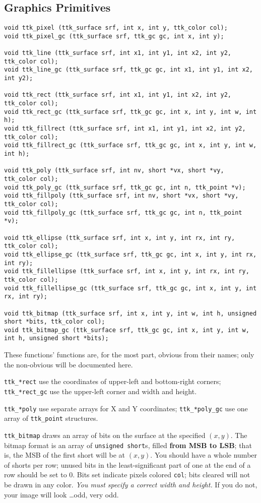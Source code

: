 \documentclass[12pt,letterpaper]{report}
\begin{document}
\subsection{Graphics Primitives}
{\footnotesize
\begin{verbatim}
void ttk_pixel (ttk_surface srf, int x, int y, ttk_color col);
void ttk_pixel_gc (ttk_surface srf, ttk_gc gc, int x, int y);

void ttk_line (ttk_surface srf, int x1, int y1, int x2, int y2, ttk_color col);
void ttk_line_gc (ttk_surface srf, ttk_gc gc, int x1, int y1, int x2, int y2);

void ttk_rect (ttk_surface srf, int x1, int y1, int x2, int y2, ttk_color col);
void ttk_rect_gc (ttk_surface srf, ttk_gc gc, int x, int y, int w, int h);
void ttk_fillrect (ttk_surface srf, int x1, int y1, int x2, int y2, ttk_color col);
void ttk_fillrect_gc (ttk_surface srf, ttk_gc gc, int x, int y, int w, int h);

void ttk_poly (ttk_surface srf, int nv, short *vx, short *vy, ttk_color col);
void ttk_poly_gc (ttk_surface srf, ttk_gc gc, int n, ttk_point *v);
void ttk_fillpoly (ttk_surface srf, int nv, short *vx, short *vy, ttk_color col);
void ttk_fillpoly_gc (ttk_surface srf, ttk_gc gc, int n, ttk_point *v);

void ttk_ellipse (ttk_surface srf, int x, int y, int rx, int ry, ttk_color col);
void ttk_ellipse_gc (ttk_surface srf, ttk_gc gc, int x, int y, int rx, int ry);
void ttk_fillellipse (ttk_surface srf, int x, int y, int rx, int ry, ttk_color col);
void ttk_fillellipse_gc (ttk_surface srf, ttk_gc gc, int x, int y, int rx, int ry);

void ttk_bitmap (ttk_surface srf, int x, int y, int w, int h, unsigned short *bits, ttk_color col);
void ttk_bitmap_gc (ttk_surface srf, ttk_gc gc, int x, int y, int w, int h, unsigned short *bits);
\end{verbatim}
}

These functions' functions are, for the most part,
obvious from their names; only the non-obvious will be documented here.

\verb|ttk_*rect| use the coordinates of upper-left and bottom-right corners; \verb|ttk_*rect_gc| use
the upper-left corner and width and height.

\verb|ttk_*poly| use separate arrays for X and Y coordinates; \verb|ttk_*poly_gc| use one array of
\verb|ttk_point| structures.

\verb|ttk_bitmap| draws an array of bits on the surface at the specified $(x,y)$. The bitmap format
is an array of \verb|unsigned short|s, filled {\bf from MSB to LSB}; that is, the MSB of the first
short will be at $(x,y)$. You should have a whole number of shorts per row; unused bits in the least-significant
part of one at the end of a row should be set to 0.
Bits set indicate pixels colored \verb|col|; bits cleared will not be
drawn in any color. {\it You must specify a correct width and height.} If you do not, your image will
look \ldots odd, very odd.
\end{document}
